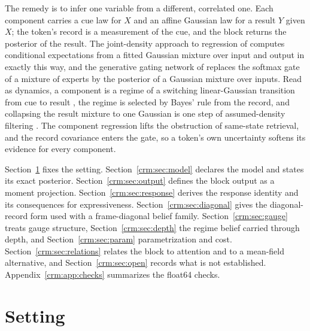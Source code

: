 \documentclass[11pt]{article}
\theoremstyle{definition}
\theoremstyle{remark}
\begin{document}
The remedy is to infer one variable from a different, correlated one. Each component carries a cue law for $X$ and an affine Gaussian law for a result $Y$ given $X$; the token's record is a measurement of the cue, and the block returns the posterior of the result. The joint-density approach to regression of \citet{GhahramaniJordan1994Incomplete} computes conditional expectations from a fitted Gaussian mixture over input and output in exactly this way, and the generative gating network of \citet{Xu1995AlternativeMoE} replaces the softmax gate of a mixture of experts \citep{Jacobs1991LocalExperts,JordanJacobs1994HME} by the posterior of a Gaussian mixture over inputs. Read as dynamics, a component is a regime of a switching linear-Gaussian transition from cue to result \citep{GhahramaniHinton2000Switching}, the regime is selected by Bayes' rule from the record, and collapsing the result mixture to one Gaussian is one step of assumed-density filtering \citep{Minka2001Thesis}. The component regression lifts the obstruction of same-state retrieval, and the record covariance enters the gate, so a token's own uncertainty softens its evidence for every component.

Section~\ref{crm:sec:setting} fixes the setting. Section~\ref{crm:sec:model} declares the model and states its exact posterior. Section~\ref{crm:sec:output} defines the block output as a moment projection. Section~\ref{crm:sec:response} derives the response identity and its consequences for expressiveness. Section~\ref{crm:sec:diagonal} gives the diagonal-record form used with a frame-diagonal belief family. Section~\ref{crm:sec:gauge} treats gauge structure, Section~\ref{crm:sec:depth} the regime belief carried through depth, and Section~\ref{crm:sec:param} parametrization and cost. Section~\ref{crm:sec:relations} relates the block to attention and to a mean-field alternative, and Section~\ref{crm:sec:open} records what is not established. Appendix~\ref{crm:app:checks} summarizes the float64 checks.

\section{Setting}
\label{crm:sec:setting}
\end{document}
